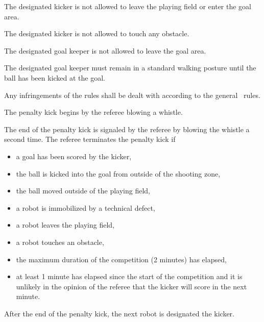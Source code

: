 \documentclass[12pt]{hurocup}
\begin{document}
\begin{lawlist}[PK]
\item The designated kicker is not allowed to leave the playing field
  or enter the goal area.

\item The designated kicker is not allowed to touch any obstacle.

\item The designated goal keeper is not allowed to leave the goal
area.

\item The designated goal keeper must remain in a standard walking
posture until the ball has been kicked at the goal.

\item Any infringements of the rules shall be dealt with according to
the general \HuroCup\ rules.

\item The penalty kick begins by the referee blowing a whistle.

\item The end of the penalty kick is signaled by the referee by
  blowing the whistle a second time.
  The referee terminates the penalty kick if
  \begin{itemize}
  \item a goal has been scored by the kicker,
  \item the ball is kicked into the goal from outside of the shooting zone,
  \item the ball moved outside of the playing field,
  \item a robot is immobilized by a technical defect,
  \item a robot leaves the playing field,
  \item a robot touches an obstacle,
  \item the maximum duration of the competition (2 minutes) has elapsed,
  \item at least 1 minute has elapsed since the start of the
    competition and it is unlikely in the opinion of the referee that
    the kicker will score in the next minute.
  \end{itemize}

\item After the end of the penalty kick, the next robot is
  designated the kicker.

\end{lawlist}

\label{penalty-scoring}
\end{document}
